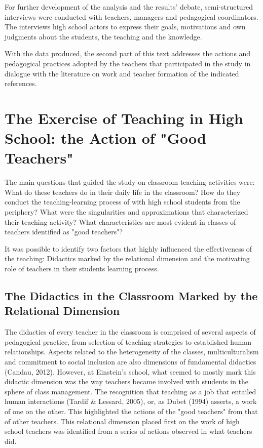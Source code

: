 \documentclass[11pt, a4paper]{article}
\begin{document}
For further development of the analysis and the results' debate, semi-structured interviews were conducted with teachers,
managers and pedagogical coordinators. The interviews high school actors to express their goals, motivations and own
judgments about the students, the teaching and the knowledge.

With the data produced, the second part of this text addresses the actions and pedagogical practices adopted by the
teachers that participated in the study in dialogue with the literature on work and teacher formation of the indicated
references.

\section{The Exercise of Teaching in High School: the Action of "Good Teachers"}
The main questions that guided the study on classroom teaching activities were: What do these teachers do in their daily
life in the classroom? How do they conduct the teaching-learning process of with high school students from the periphery?
What were the singularities and approximations that characterized their teaching activity? What characteristics are most
evident in classes of teachers identified as "good teachers"?

It was possible to identify two factors that highly influenced the effectiveness of the teaching: Didactics marked by the
relational dimension and the motivating role of teachers in their students learning process.

\subsection{The Didactics in the Classroom Marked by the Relational Dimension}
The didactics of every teacher in the classroom is comprised of several aspects of pedagogical practice, from selection of
teaching strategies to established human relationships. Aspects related to the heterogeneity of the classes,
multiculturalism and commitment to social inclusion are also dimensions of fundamental didactics (Candau,
2012). However, at Einstein's school, what seemed to mostly mark this didactic dimension was the way teachers became
involved with students in the sphere of class management. The recognition that teaching as a job that entailed human
interactions (Tardif \& Lessard, 2005), or, as Dubet (1994) asserts, a work of one on the other. This highlighted the actions
of the "good teachers" from that of other teachers. This relational dimension placed first on the work of high school
teachers was identified from a series of actions observed in what teachers did.
\end{document}
